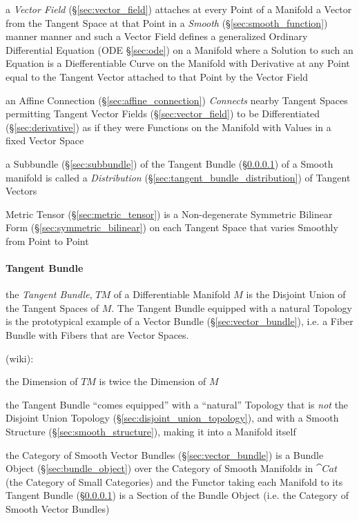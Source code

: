 a \emph{Vector Field} (\S\ref{sec:vector_field}) attaches at every Point of a
Manifold a Vector from the Tangent Space at that Point in a \emph{Smooth}
(\S\ref{sec:smooth_function}) manner manner and such a Vector Field defines a
generalized Ordinary Differential Equation (ODE \S\ref{sec:ode}) on a Manifold
where a Solution to such an Equation is a Diefferentiable Curve on the Manifold
with Derivative at any Point equal to the Tangent Vector attached to that Point
by the Vector Field

\fist an Affine Connection (\S\ref{sec:affine_connection}) \emph{Connects}
nearby Tangent Spaces permitting Tangent Vector Fields
(\S\ref{sec:vector_field}) to be Differentiated (\S\ref{sec:derivative}) as if
they were Functions on the Manifold with Values in a fixed Vector Space

a Subbundle (\S\ref{sec:subbundle}) of the Tangent Bundle
(\S\ref{sec:tangent_bundle}) of a Smooth manifold is called a
\emph{Distribution} (\S\ref{sec:tangent_bundle_distribution}) of Tangent
Vectors

Metric Tensor (\S\ref{sec:metric_tensor}) is a Non-degenerate Symmetric Bilinear
Form (\S\ref{sec:symmetric_bilinear}) on each Tangent Space that varies Smoothly
from Point to Point



\paragraph{Tangent Bundle}\label{sec:tangent_bundle}\hfill

the \emph{Tangent Bundle}, $T M$ of a Differentiable Manifold $M$ is the
Disjoint Union of the Tangent Spaces of $M$. The Tangent Bundle equipped with a
natural Topology is the prototypical example of a Vector Bundle
(\S\ref{sec:vector_bundle}), i.e. a Fiber Bundle with Fibers that are Vector
Spaces.

(wiki):

the Dimension of $T M$ is twice the Dimension of $M$

the Tangent Bundle ``comes equipped'' with a ``natural'' Topology that is
\emph{not} the Disjoint Union Topology (\S\ref{sec:disjoint_union_topology}),
and with a Smooth Structure (\S\ref{sec:smooth_structure}), making it into a
Manifold itself

the Category of Smooth Vector Bundles (\S\ref{sec:vector_bundle}) is a Bundle
Object (\S\ref{sec:bundle_object}) over the Category of Smooth Manifolds in
$\cat{Cat}$ (the Category of Small Categories) and the Functor taking each
Manifold to its Tangent Bundle (\S\ref{sec:tangent_bundle}) is a Section of the
Bundle Object (i.e. the Category of Smooth Vector Bundles)

